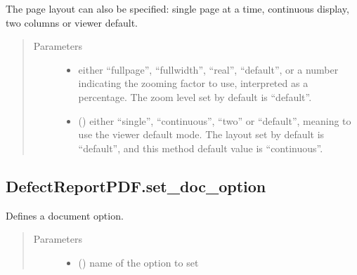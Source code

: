 \documentclass[letterpaper,10pt,english]{sphinxmanual}
\begin{document}
\begin{fulllineitems}
\begin{fulllineitems}
\sphinxAtStartPar
The page layout can also be specified: single page at a time, continuous display, two columns or viewer default.
\begin{quote}\begin{description}
\item[{Parameters}] \leavevmode\begin{itemize}
\item {} 
\sphinxAtStartPar
{} \textendash{} either “fullpage”, “fullwidth”, “real”, “default”,
or a number indicating the zooming factor to use, interpreted as a percentage.
The zoom level set by default is “default”.

\item {} 
\sphinxAtStartPar
{} () \textendash{} either “single”, “continuous”, “two” or “default”,
meaning to use the viewer default mode.
The layout set by default is “default”,
and this method default value is “continuous”.

\end{itemize}

\end{description}\end{quote}

\end{fulllineitems}



\subsection{DefectReportPDF.set\_doc\_option}
\label{\detokenize{generated/quality_assessment.quality_pdf_report.DefectReportPDF.set_doc_option:defectreportpdf-set-doc-option}}\label{\detokenize{generated/quality_assessment.quality_pdf_report.DefectReportPDF.set_doc_option::doc}}

\begin{fulllineitems}
\label{\detokenize{generated/quality_assessment.quality_pdf_report.DefectReportPDF.set_doc_option:quality_assessment.quality_pdf_report.DefectReportPDF.set_doc_option}}
\sphinxAtStartPar
Defines a document option.
\begin{quote}\begin{description}
\item[{Parameters}] \leavevmode\begin{itemize}
\item {} 
\sphinxAtStartPar
{} () \textendash{} name of the option to set


\end{itemize}
\end{description}
\end{quote}
\end{fulllineitems}
\end{fulllineitems}
\end{document}
